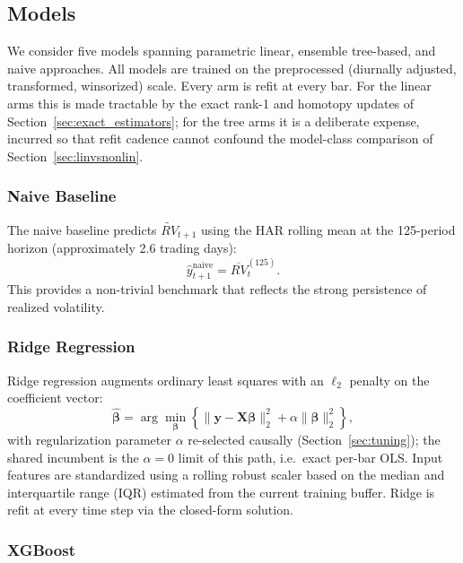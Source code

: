 \subsection{Models}
\label{sec:models}

We consider five models spanning parametric linear, ensemble tree-based, and naive approaches. All models are trained on the preprocessed (diurnally adjusted, transformed, winsorized) scale. Every arm is refit at every bar. For the linear arms this is made tractable by the exact rank-1 and homotopy updates of Section~\ref{sec:exact_estimators}; for the tree arms it is a deliberate expense, incurred so that refit cadence cannot confound the model-class comparison of Section~\ref{sec:linvsnonlin}.

\subsubsection{Naive Baseline}
\label{sec:naive}

The naive baseline predicts $\widetilde{RV}_{t+1}$ using the HAR rolling mean at the 125-period horizon (approximately 2.6 trading days):
\begin{equation}
    \hat{y}_{t+1}^{\mathrm{naive}} = \overline{RV}_t^{(125)}.
    \label{eq:naive}
\end{equation}
This provides a non-trivial benchmark that reflects the strong persistence of realized volatility.

\subsubsection{Ridge Regression}
\label{sec:ridge}

Ridge regression augments ordinary least squares with an $\ell_2$ penalty on the coefficient vector:
\begin{equation}
    \hat{\boldsymbol{\beta}} = \arg\min_{\boldsymbol{\beta}} \left\{ \|\mathbf{y} - \mathbf{X}\boldsymbol{\beta}\|_2^2 + \alpha \|\boldsymbol{\beta}\|_2^2 \right\},
    \label{eq:ridge}
\end{equation}
with regularization parameter $\alpha$ re-selected causally (Section~\ref{sec:tuning}); the shared incumbent is the $\alpha = 0$ limit of this path, i.e.\ exact per-bar OLS. Input features are standardized using a rolling robust scaler based on the median and interquartile range (IQR) estimated from the current training buffer. Ridge is refit at every time step via the closed-form solution.

\subsubsection{XGBoost}
\label{sec:xgboost}

